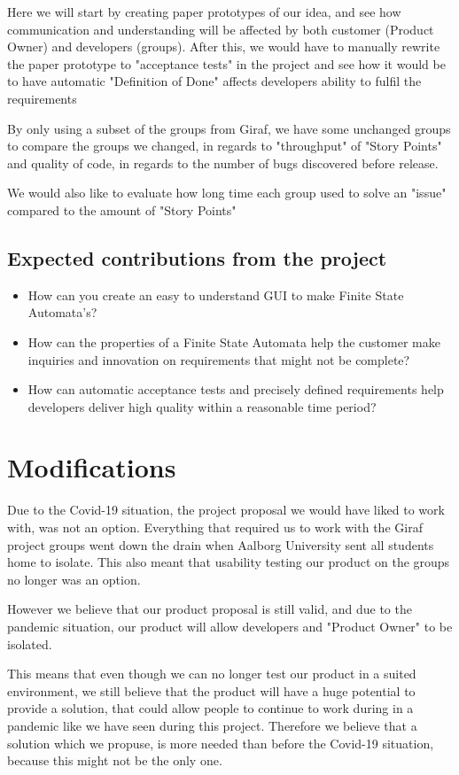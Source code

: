 Here we will start by creating paper prototypes of our idea, and see how communication and understanding will be affected by both customer (Product Owner) and developers (groups).
After this, we would have to manually rewrite the paper prototype to "acceptance tests" in the project and see how it would be to have automatic "Definition of Done" affects developers ability to fulfil the requirements

By only using a subset of the groups from Giraf, we have some unchanged groups to compare the groups we changed, in regards to "throughput" of "Story Points" and quality of code, in regards to the number of bugs discovered before release.

We would also like to evaluate how long time each group used to solve an "issue" compared to the amount of "Story Points" 


\subsection{Expected contributions from the project}
\begin{itemize}
    \item How can you create an easy to understand GUI to make Finite State Automata's?
    \item How can the properties of a Finite State Automata help the customer make inquiries and innovation on requirements that might not be complete?
    \item How can automatic acceptance tests and precisely defined requirements help developers deliver high quality within a reasonable time period?
\end{itemize}
\section{Modifications}
Due to the Covid-19 situation, the project proposal we would have liked to work with, was not an option.
Everything that required us to work with the Giraf project groups went down the drain when Aalborg University sent all students home to isolate.
This also meant that usability testing our product on the groups no longer was an option. 

However we believe that our product proposal is still valid, and due to the pandemic situation, our product will allow developers and "Product Owner" to be isolated.

This means that even though we can no longer test our product in a suited environment, we still believe that the product will have a huge potential to provide a solution, that could allow people to continue to work during in a pandemic like we have seen during this project.
Therefore we believe that a solution which we propuse, is more needed than before the Covid-19 situation, because this might not be the only one.
